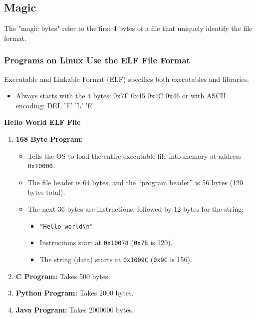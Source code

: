 \documentclass[twoside]{article}
\begin{document}
\subsection{Magic}
\begin{definition}
    The "magic bytes" refer to the first 4 bytes of a file that uniquely identify the file format. 
\end{definition}

\subsubsection{Programs on Linux Use the ELF File Format}
\begin{definition}
    Executable and Linkable Format (ELF) specifies both executables and libraries.
    \begin{itemize}
        \item Always starts with the 4 bytes: 0x7F 0x45 0x4C 0x46 or with ASCII encoding: DEL 'E' 'L' 'F'
    \end{itemize}
\end{definition}

\begin{example} \textbf{Hello World ELF File}
    \begin{enumerate}
        \item \textbf{168 Byte Program:}
        \begin{itemize}
            \item Tells the OS to load the entire executable file into memory at address \texttt{0x10000}.
            \item The file header is 64 bytes, and the ``program header'' is 56 bytes (120 bytes total).
            \item The next 36 bytes are instructions, followed by 12 bytes for the string:
                \begin{itemize}
                    \item \texttt{"Hello world\textbackslash n"}
                    \item Instructions start at \texttt{0x10078} (\texttt{0x78} is 120).
                    \item The string (data) starts at \texttt{0x1009C} (\texttt{0x9C} is 156).
                \end{itemize}
        \end{itemize} 
        \item \textbf{C Program:} Takes 500 bytes.
        \item \textbf{Python Program:} Takes 2000 bytes.
        \item \textbf{Java Program:} Takes 2000000 bytes.
    \end{enumerate}
\end{example}
\end{document}
